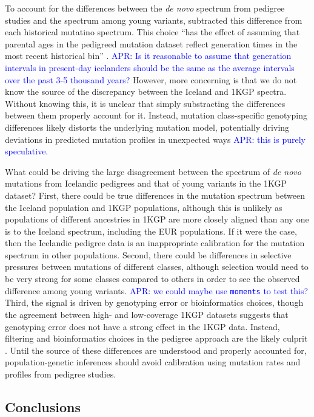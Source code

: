 \documentclass[]{article}
\newcommand{\aprcomment}[1]{{\textcolor{blue}{APR: #1}}}
\begin{document}
To account for the differences between the \emph{de novo} spectrum from
pedigree studies \citep{jonsson2017parental} and the spectrum among young
variants, \citet{wang2023human} subtracted this difference from each historical
mutatino spectrum. This choice ``has the effect of assuming that parental ages
in the pedigreed mutation dataset reflect generation times in the most recent
historical bin'' \citep{wang2023human}. \aprcomment{Is it reasonable to assume
    that generation intervals in present-day icelanders should be the same as
the average intervals over the past 3-5 thousand years?} However, more
concerning is that we do not know the source of the discrepancy between the
Iceland and 1KGP spectra. Without knowing this, it is unclear that simply
substracting the differences between them properly account for it. Instead,
mutation class-specific genotyping differences likely distorts the underlying
mutation model, potentially driving deviations in predicted mutation profiles
in unexpected ways \aprcomment{this is purely speculative}.

What could be driving the large disagreement between the spectrum of \emph{de
novo} mutations from Icelandic pedigrees and that of young variants in the 1KGP
dataset? First, there could be true differences in the mutation spectrum
between the Iceland population and 1KGP populations, although this is unlikely
as populations of different ancestries in 1KGP are more closely aligned than
any one is to the Iceland spectrum, including the EUR populations. If it were
the case, then the Icelandic pedigree data is an inappropriate calibration for
the mutation spectrum in other populations. Second, there could be differences
in selective pressures between mutations of different classes, although
selection would need to be very strong for some classes compared to others in
order to see the observed difference among young variants. \aprcomment{we could
maybe use \texttt{moments} to test this?} Third, the signal is driven by
genotyping error or bioinformatics choices, though the agreement between high-
and low-coverage 1KGP datasets suggests that genotyping error does not have a
strong effect in the 1KGP data. Instead, filtering and bioinformatics choices
in the pedigree approach are the likely culprit
\citep{bergeron2022mutationathon}. Until the source of these differences are
understood and properly accounted for, population-genetic inferences should
avoid calibration using mutation rates and profiles from pedigree studies.

\subsection*{Conclusions}
\end{document}
